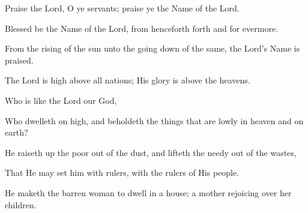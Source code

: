 Praise the Lord, O ye servants; praise ye the Name of the Lord.

Blessed be the Name of the Lord, from henceforth forth and for evermore.

From the rising of the sun unto the going down of the same, the Lord’s Name is praised.

The Lord is high above all nations; His glory is above the heavens.

Who is like the Lord our God,

Who dwelleth on high, and beholdeth the things that are lowly in heaven and on earth?

He raiseth up the poor out of the dust, and lifteth the needy out of the wastes,

That He may set him with rulers, with the rulers of His people.

He maketh the barren woman to dwell in a house; a mother rejoicing over her children.
